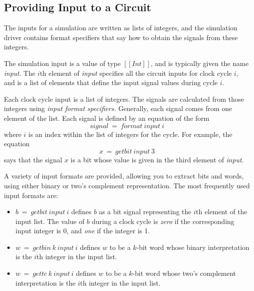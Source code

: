 \documentclass[a4paper,openany,fleqn]{book}
\begin{document}
\subsection{Providing Input to a Circuit}
\label{sec:providing-input}

The inputs for a simulation are written as lists of integers, and the
simulation driver contains format specifiers that say how to obtain
the signals from these integers.

The simulation input is a value of type $[[\textit{Int}]]$, and is
typically given the name \textit{input}.  The $i$th element of
\textit{input} specifies all the circuit inputs for clock cycle $i$,
and is a list of elements that define the input signal values during
cycle $i$.

Each clock cycle input is a list of integers.  The signals are
calculated from those integers using \emph{input format specifiers.}
Generally, each signal comes from one element of the list.  Each
signal is defined by an equation of the form
\begin{equation}
  \label{eq:1}
  \mathit{signal}\ =\ \mathit{format}\ \mathit{input}\ i
\end{equation}
where $i$ is an index within the list of integers for the cycle.  For
example, the equation
\begin{equation}
  \label{eq:2}
  x\ =\ \mathit{getbit}\ \mathit{input}\ 3
\end{equation}
says that the signal $x$ is a bit whose value is given in the third
element of \textit{input}.

A variety of input formats are provided, allowing you to extract bits
and words, using either binary or two's complement representation.
The most frequently used input formats are:

\begin{itemize}
\item $b\ =\ \mathit{getbit}\ \mathit{input}\ i$ defines $b$ as a bit
  signal representing the $i$th element of the input list.  The value
  of $b$ during a clock cycle is \textit{zero} if the corresponding
  input integer is 0, and \textit{one} if the integer is 1.
\item $w\ =\ \mathit{getbin}\ k\ \mathit{input}\ i$ defines $w$ to be
  a $k$-bit word whose binary interpretation is the $i$th integer in
  the input list.
\item $w\ =\ \mathit{gettc}\ k\ \mathit{input}\ i$ defines $w$ to be a
  $k$-bit word whose two's complement interpretation is the $i$th
  integer in the input list.
\end{itemize}
\end{document}
